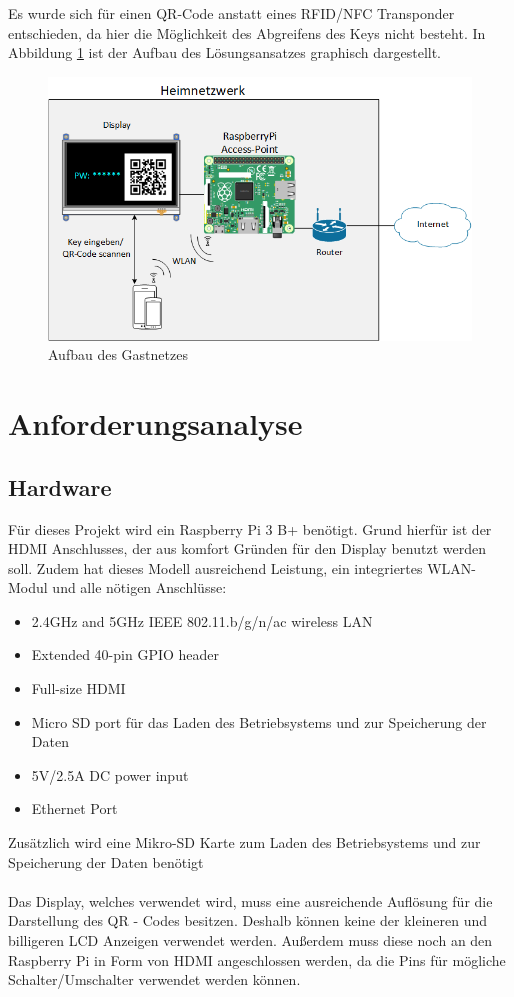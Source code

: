 \documentclass[a4paper,11pt,singlespacing]{article}
\begin{document}
	Es wurde sich für einen QR-Code anstatt eines RFID/NFC Transponder entschieden, da hier die Möglichkeit des Abgreifens des Keys nicht besteht. In Abbildung  \ref{aufbau} ist der Aufbau des Lösungsansatzes graphisch dargestellt.

	\begin{figure}[ht]
		\centering
		\includegraphics[scale=0.6]{skizze}
			\caption{Aufbau des Gastnetzes}
			\label{aufbau}
	\end{figure}

	
	\section{Anforderungsanalyse}

		\subsection{Hardware}
		Für dieses Projekt wird ein Raspberry Pi 3 B+ benötigt. Grund hierfür ist der HDMI Anschlusses, der aus komfort Gründen für den Display benutzt werden soll. Zudem hat dieses Modell ausreichend Leistung, ein integriertes WLAN-Modul und alle nötigen Anschlüsse:
		\begin{itemize}
			\item 2.4GHz and 5GHz IEEE 802.11.b/g/n/ac wireless LAN
			\item Extended 40-pin GPIO header
			\item Full-size HDMI
			\item Micro SD port für das Laden des Betriebsystems und zur Speicherung der Daten
			\item 5V/2.5A DC power input
			\item Ethernet Port
		\end{itemize}
		Zusätzlich wird eine Mikro-SD Karte zum Laden des Betriebsystems und zur Speicherung der Daten benötigt \\ \\
		Das Display, welches verwendet wird, muss eine ausreichende Auflösung für die Darstellung des QR - Codes besitzen. Deshalb können keine der kleineren und billigeren LCD Anzeigen verwendet werden. Außerdem muss diese noch an den Raspberry Pi in Form von HDMI angeschlossen werden, da die Pins für mögliche Schalter/Umschalter verwendet werden können.
		
\end{document}
